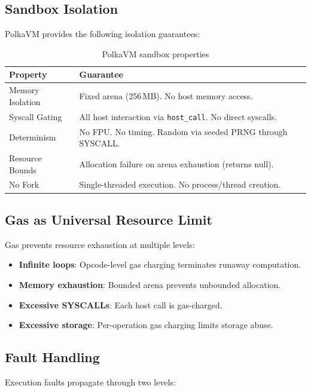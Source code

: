 \documentclass[11pt,a4paper]{article}
\begin{document}
\subsection{Sandbox Isolation}

PolkaVM provides the following isolation guarantees:

\begin{table}[H]
\centering
\begin{tabular}{lp{8cm}}
\toprule
\textbf{Property} & \textbf{Guarantee} \\
\midrule
Memory Isolation & Fixed arena (256\,MB). No host memory access. \\
Syscall Gating & All host interaction via \texttt{host\_call}. No direct syscalls. \\
Determinism & No FPU. No timing. Random via seeded PRNG through SYSCALL. \\
Resource Bounds & Allocation failure on arena exhaustion (returns null). \\
No Fork & Single-threaded execution. No process/thread creation. \\
\bottomrule
\end{tabular}
\caption{PolkaVM sandbox properties}
\end{table}

\subsection{Gas as Universal Resource Limit}

Gas prevents resource exhaustion at multiple levels:

\begin{itemize}[noitemsep]
    \item \textbf{Infinite loops}: Opcode-level gas charging terminates
          runaway computation.
    \item \textbf{Memory exhaustion}: Bounded arena prevents unbounded
          allocation.
    \item \textbf{Excessive SYSCALLs}: Each host call is gas-charged.
    \item \textbf{Excessive storage}: Per-operation gas charging limits
          storage abuse.
\end{itemize}

\subsection{Fault Handling}

Execution faults propagate through two levels:
\end{document}
